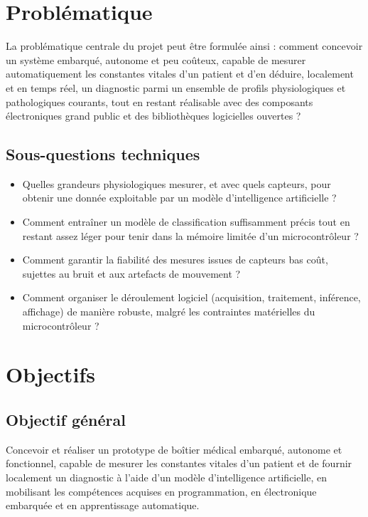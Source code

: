 \documentclass[12pt,a4paper]{report}
\begin{document}
\section{Problématique}
La problématique centrale du projet peut être formulée ainsi : comment concevoir un système embarqué, autonome et peu coûteux, capable de mesurer automatiquement les constantes vitales d'un patient et d'en déduire, localement et en temps réel, un diagnostic parmi un ensemble de profils physiologiques et pathologiques courants, tout en restant réalisable avec des composants électroniques grand public et des bibliothèques logicielles ouvertes ?

\subsection*{Sous-questions techniques}
\begin{itemize}
    \item Quelles grandeurs physiologiques mesurer, et avec quels capteurs, pour obtenir une donnée exploitable par un modèle d'intelligence artificielle ?
    \item Comment entraîner un modèle de classification suffisamment précis tout en restant assez léger pour tenir dans la mémoire limitée d'un microcontrôleur ?
    \item Comment garantir la fiabilité des mesures issues de capteurs bas coût, sujettes au bruit et aux artefacts de mouvement ?
    \item Comment organiser le déroulement logiciel (acquisition, traitement, inférence, affichage) de manière robuste, malgré les contraintes matérielles du microcontrôleur ?
\end{itemize}

\section{Objectifs}

\subsection{Objectif général}
Concevoir et réaliser un prototype de boîtier médical embarqué, autonome et fonctionnel, capable de mesurer les constantes vitales d'un patient et de fournir localement un diagnostic à l'aide d'un modèle d'intelligence artificielle, en mobilisant les compétences acquises en programmation, en électronique embarquée et en apprentissage automatique.
\end{document}
